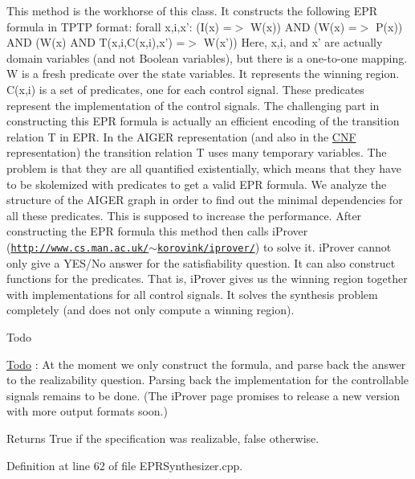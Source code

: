 This method is the workhorse of this class. It constructs the following E\-P\-R formula in T\-P\-T\-P format\-: forall x,i,x'\-: (I(x) =$>$ W(x)) A\-N\-D (W(x) =$>$ P(x)) A\-N\-D (W(x) A\-N\-D T(x,i,C(x,i),x') =$>$ W(x')) Here, x,i, and x' are actually domain variables (and not Boolean variables), but there is a one-\/to-\/one mapping. W is a fresh predicate over the state variables. It represents the winning region. C(x,i) is a set of predicates, one for each control signal. These predicates represent the implementation of the control signals. The challenging part in constructing this E\-P\-R formula is actually an efficient encoding of the transition relation T in E\-P\-R. In the A\-I\-G\-E\-R representation (and also in the \hyperlink{classCNF}{C\-N\-F} representation) the transition relation T uses many temporary variables. The problem is that they are all quantified existentially, which means that they have to be skolemized with predicates to get a valid E\-P\-R formula. We analyze the structure of the A\-I\-G\-E\-R graph in order to find out the minimal dependencies for all these predicates. This is supposed to increase the performance. After constructing the E\-P\-R formula this method then calls i\-Prover (\href{http://www.cs.man.ac.uk/~korovink/iprover/}{\tt http\-://www.\-cs.\-man.\-ac.\-uk/$\sim$korovink/iprover/}) to solve it. i\-Prover cannot only give a Y\-E\-S/\-No answer for the satisfiability question. It can also construct functions for the predicates. That is, i\-Prover gives us the winning region together with implementations for all control signals. It solves the synthesis problem completely (and does not only compute a winning region).

\begin{DoxyRefDesc}{Todo}
\item[\hyperlink{todo__todo000006}{Todo}]\-: At the moment we only construct the formula, and parse back the answer to the realizability question. Parsing back the implementation for the controllable signals remains to be done. (The i\-Prover page promises to release a new version with more output formats soon.)\end{DoxyRefDesc}


\begin{DoxyReturn}{Returns}
True if the specification was realizable, false otherwise. 
\end{DoxyReturn}


Definition at line 62 of file E\-P\-R\-Synthesizer.\-cpp.



